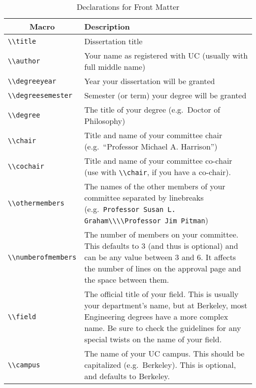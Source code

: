 \documentclass[11pt]{article}
\begin{document}
\begin{table}
\centering
\lstset{basicstyle=\ttfamily}
\begin{tabularx}{.9\textwidth}{lX}
\toprule
\multicolumn{1}{c}{Macro} & \multicolumn{1}{l}{Description} \\
\midrule
\lstinline|\\title| & Dissertation title \\
\lstinline|\\author| & Your name as registered with UC (usually with full
  middle name) \\
\lstinline|\\degreeyear| & Year your dissertation will be granted \\
\lstinline|\\degreesemester| & Semester (or term) your degree will be granted \\
\lstinline|\\degree| & The title of your degree (e.g.~Doctor of Philosophy) \\
\lstinline|\\chair| & Title and name of your committee chair
  (e.g.~``Professor Michael A. Harrison'') \\
\lstinline|\\cochair| & Title and name of your committee co-chair
  (use with \lstinline|\\chair|, if you have a co-chair). \\
\lstinline|\\othermembers| & The names of the other members of your committee
  separated by linebreaks
  (e.g.~\lstinline!Professor Susan L. Graham\\\\Professor Jim Pitman!) \\
\lstinline|\\numberofmembers| & The number of members on your committee.
  This defaults to 3 (and thus is optional) and can be any value between
  3 and 6.  It affects the number of lines on the approval
  page and the space between them. \\
\lstinline|\\field| & The official title of your field.  This is usually
  your department's name, but at Berkeley, most
  Engineering degrees have a more complex name.
  Be sure to check the guidelines for any special
  twists on the name of your field. \\
\lstinline|\\campus| & The name of your UC campus.  This should be capitalized
  (e.g.~Berkeley).  This is optional, and defaults to Berkeley. \\
\bottomrule
\end{tabularx}
\caption{Declarations for Front Matter}\label{decls}
\end{table}
\end{document}

